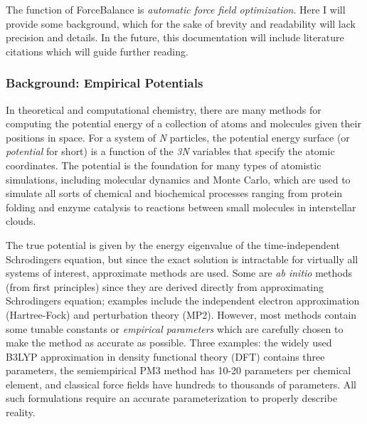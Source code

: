The function of Force\+Balance is {\itshape automatic force field optimization}. Here I will provide some background, which for the sake of brevity and readability will lack precision and details. In the future, this documentation will include literature citations which will guide further reading.\hypertarget{index_background}{}\subsubsection{Background\+: Empirical Potentials}\label{index_background}
In theoretical and computational chemistry, there are many methods for computing the potential energy of a collection of atoms and molecules given their positions in space. For a system of {\itshape N} particles, the potential energy surface (or {\itshape potential} for short) is a function of the {\itshape 3N} variables that specify the atomic coordinates. The potential is the foundation for many types of atomistic simulations, including molecular dynamics and Monte Carlo, which are used to simulate all sorts of chemical and biochemical processes ranging from protein folding and enzyme catalysis to reactions between small molecules in interstellar clouds.

The true potential is given by the energy eigenvalue of the time-\/independent Schrodinger\textquotesingle{}s equation, but since the exact solution is intractable for virtually all systems of interest, approximate methods are used. Some are {\itshape ab initio} methods (\textquotesingle{}from first principles\textquotesingle{}) since they are derived directly from approximating Schrodinger\textquotesingle{}s equation; examples include the independent electron approximation (Hartree-\/\+Fock) and perturbation theory (M\+P2). However, most methods contain some tunable constants or {\itshape empirical parameters} which are carefully chosen to make the method as accurate as possible. Three examples\+: the widely used B3\+L\+YP approximation in density functional theory (D\+FT) contains three parameters, the semiempirical P\+M3 method has 10-\/20 parameters per chemical element, and classical force fields have hundreds to thousands of parameters. All such formulations require an accurate parameterization to properly describe reality.

